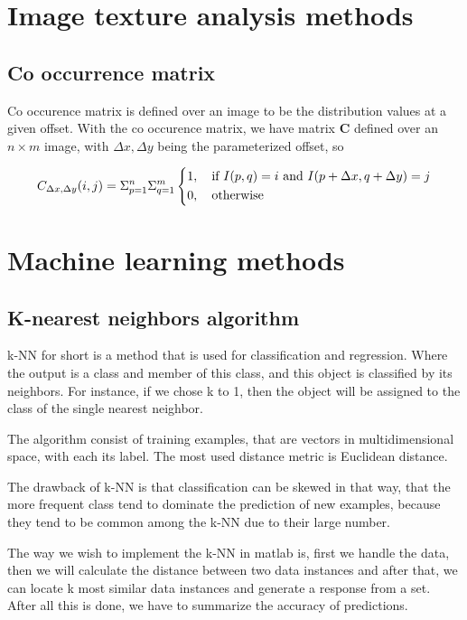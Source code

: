 \section{Image texture analysis methods}

\subsection{Co occurrence matrix}

Co occurence matrix is defined over an image to be the distribution values at a given offset.\cite{Bharati} With the co occurence matrix, we have matrix \textbf{C} defined over an $n \times m$ image, with $\Delta x, \Delta y$ being the parameterized offset, so

\[
C_{\Delta x, \Delta y}(i, j) = \Sigma_{p=1}^n\Sigma_{q=1}^m
\begin{dcases}
  1, \quad \text{if } I(p,q)=i \text{ and } I(p+\Delta x, q+ \Delta y) =j \\
  0, \quad \text{otherwise}
\end{dcases}
\]

\section{Machine learning methods}

\subsection{K-nearest neighbors algorithm}

k-NN for short is a method that is used for classification and regression. Where the output is a class and member of this class, and this object is classified by its neighbors. For instance, if we chose k to 1, then the object will be assigned to the class of the single nearest neighbor.

The algorithm consist of training examples, that are vectors in multidimensional space, with each its label. The most used distance metric is Euclidean distance.

The drawback of k-NN is that classification can be skewed in that way, that the more frequent class tend to dominate the prediction of new examples, because they tend to be common among the k-NN due to their large number.

The way we wish to implement the k-NN in matlab is, first we handle the data, then we will calculate the distance between two data instances and after that, we can locate k most similar data instances and generate a response from a set. After all this is done, we have to summarize the accuracy of predictions.



